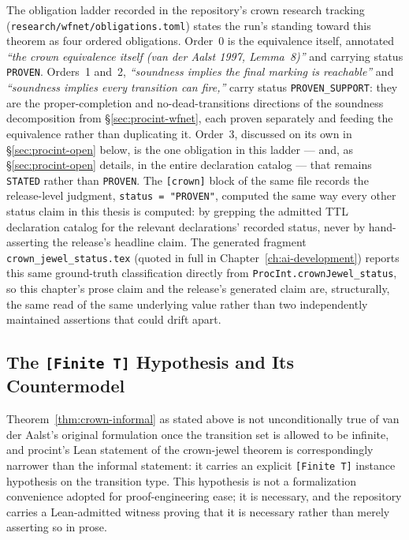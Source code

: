 The obligation ladder recorded in the repository's crown research
tracking (\texttt{research/wfnet/obligations.toml}) states the run's
standing toward this theorem as four ordered obligations. Order~0 is the
equivalence itself, annotated \emph{``the crown equivalence itself (van
der Aalst 1997, Lemma~8)''} and carrying status \texttt{PROVEN}. Orders~1
and~2, \emph{``soundness implies the final marking is reachable''} and
\emph{``soundness implies every transition can fire,''} carry status
\texttt{PROVEN\_SUPPORT}: they are the proper-completion and
no-dead-transitions directions of the soundness decomposition from
\S\ref{sec:procint-wfnet}, each proven separately and feeding the
equivalence rather than duplicating it. Order~3, discussed on its own in
\S\ref{sec:procint-open} below, is the one obligation in this ladder ---
and, as \S\ref{sec:procint-open} details, in the entire declaration
catalog --- that remains \texttt{STATED} rather than \texttt{PROVEN}. The
\texttt{[crown]} block of the same file records the release-level
judgment, \texttt{status = "PROVEN"}, computed the same way every other
status claim in this thesis is computed: by grepping the admitted TTL
declaration catalog for the relevant declarations' recorded status, never
by hand-asserting the release's headline claim. The generated fragment
\texttt{crown\_jewel\_status.tex} (quoted in full in
Chapter~\ref{ch:ai-development})
reports this same ground-truth classification directly from
\texttt{ProcInt.crownJewel\_status}, so this chapter's prose claim and the
release's generated claim are, structurally, the same read of the same
underlying value rather than two independently maintained assertions that
could drift apart.

\subsection{The \texttt{[Finite T]} Hypothesis and Its Countermodel}
\label{sec:procint-finite-t}

Theorem~\ref{thm:crown-informal} as stated above is not unconditionally
true of van der Aalst's original formulation once the transition set is
allowed to be infinite, and \textsf{procint}'s Lean statement of the
crown-jewel theorem is correspondingly narrower than the informal
statement: it carries an explicit \texttt{[Finite T]} instance hypothesis
on the transition type. This hypothesis is not a formalization
convenience adopted for proof-engineering ease; it is necessary, and the
repository carries a Lean-admitted witness proving that it is necessary
rather than merely asserting so in prose.

